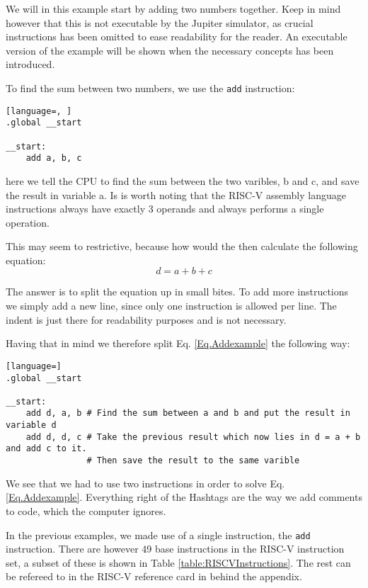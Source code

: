     We will in this example start by adding two numbers together. Keep in mind however that this is not executable by the Jupiter simulator, as crucial instructions has been omitted to ease readability for the reader. An executable version of the example will be shown when the necessary concepts has been introduced.
    
    To find the sum between two numbers, we use the \texttt{add} instruction:
    \begin{lstlisting}[language=, ]
.global __start

__start:
    add a, b, c
    \end{lstlisting}
    here we tell the CPU to find the sum between the two varibles, b and c, and save the result in variable a. Is is worth noting that the RISC-V assembly language instructions always have exactly 3 operands and always performs a single operation.
    
    This may seem to restrictive, because how would the then calculate the following equation:
    \begin{equation}\label{Eq.Addexample}
        d = a + b + c
    \end{equation}
    
    The answer is to split the equation up in small bites. To add more instructions we simply add a new line, since only one instruction is allowed per line. The indent is just there for readability purposes and is not necessary. 
    
    Having that in mind we therefore split Eq. \ref{Eq.Addexample} the following way:
    \begin{lstlisting}[language=]
.global __start

__start:
    add d, a, b # Find the sum between a and b and put the result in variable d
    add d, d, c # Take the previous result which now lies in d = a + b and add c to it. 
                # Then save the result to the same varible 
    \end{lstlisting}
    We see that we had to use two instructions in order to solve Eq. \ref{Eq.Addexample}. Everything right of the Hashtags are the way we add comments to code, which the computer ignores.
    
    In the previous examples, we made use of a single instruction, the \texttt{add} instruction. There are however 49 base instructions in the RISC-V instruction set, a subset of these is shown in Table \ref{table:RISCVInstructions}. The rest can be refereed to in the RISC-V reference card in behind the appendix.   

